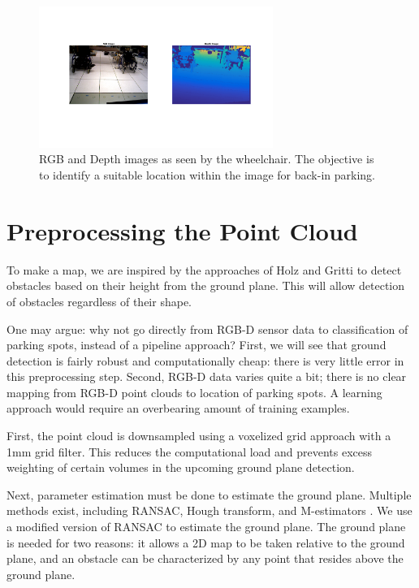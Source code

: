 \begin{figure}
\centering
\includegraphics[width=3in]{figures/rgbdwheelchair.png}
\caption{RGB and Depth images as seen by the wheelchair. The objective is to
identify a suitable location within the image for back-in parking.}
\label{fig:rgbdwheelchair}
\end{figure}


\section{Preprocessing the Point Cloud}
\label{sec:processingPointCloud}
To make a map, we are inspired by the approaches of Holz \cite{holz2013towards}
and Gritti \cite{gritti2014kinect} to detect obstacles based on their height
from the ground plane. This will allow detection of obstacles regardless of
their shape.

One may argue: why not go directly from RGB-D sensor data to classification of
parking spots, instead of a pipeline approach?
First, we will see that ground detection is fairly robust and computationally
cheap: there is very little error in this preprocessing step.
Second, RGB-D data varies quite a bit; there is no clear mapping from RGB-D
point clouds to location of parking spots. A learning approach would require an
overbearing amount of training examples.

First, the point cloud is downsampled using a voxelized grid approach with a 1mm
grid filter. This reduces the computational load and prevents excess weighting of
certain volumes in the upcoming ground plane detection.

Next, parameter estimation must be done to estimate the ground plane. Multiple methods
exist, including RANSAC, Hough transform, and M-estimators
\cite{holz2013towards}.
We use a modified version of RANSAC to estimate the ground plane. The
ground plane is needed for two reasons:
it allows a 2D map to be taken relative to the ground plane, and an obstacle can
be characterized by any point that resides above the ground plane.

